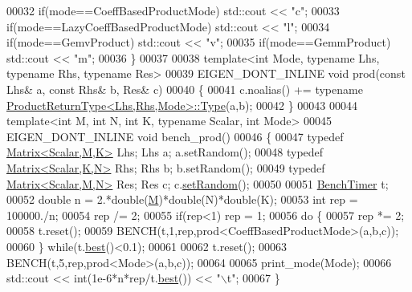 \begin{DoxyCode}
00032   \textcolor{keywordflow}{if}(mode==CoeffBasedProductMode) std::cout << \textcolor{stringliteral}{"c"};
00033   \textcolor{keywordflow}{if}(mode==LazyCoeffBasedProductMode) std::cout << \textcolor{stringliteral}{"l"};
00034   \textcolor{keywordflow}{if}(mode==GemvProduct) std::cout << \textcolor{stringliteral}{"v"};
00035   \textcolor{keywordflow}{if}(mode==GemmProduct) std::cout << \textcolor{stringliteral}{"m"};
00036 \}
00037 
00038 \textcolor{keyword}{template}<\textcolor{keywordtype}{int} Mode, \textcolor{keyword}{typename} Lhs, \textcolor{keyword}{typename} Rhs, \textcolor{keyword}{typename} Res>
00039 EIGEN\_DONT\_INLINE \textcolor{keywordtype}{void} prod(\textcolor{keyword}{const} Lhs& a, \textcolor{keyword}{const} Rhs& b, Res& c)
00040 \{
00041   c.noalias() += \textcolor{keyword}{typename} \hyperlink{struct_eigen_1_1_product_return_type}{ProductReturnType<Lhs,Rhs,Mode>::Type}(a,b);
00042 \}
00043 
00044 \textcolor{keyword}{template}<\textcolor{keywordtype}{int} M, \textcolor{keywordtype}{int} N, \textcolor{keywordtype}{int} K, \textcolor{keyword}{typename} Scalar, \textcolor{keywordtype}{int} Mode>
00045 EIGEN\_DONT\_INLINE \textcolor{keywordtype}{void} bench\_prod()
00046 \{
00047   \textcolor{keyword}{typedef} \hyperlink{group___core___module_class_eigen_1_1_matrix}{Matrix<Scalar,M,K>} Lhs; Lhs a; a.setRandom();
00048   \textcolor{keyword}{typedef} \hyperlink{group___core___module_class_eigen_1_1_matrix}{Matrix<Scalar,K,N>} Rhs; Rhs b; b.setRandom();
00049   \textcolor{keyword}{typedef} \hyperlink{group___core___module_class_eigen_1_1_matrix}{Matrix<Scalar,M,N>} Res; Res c; c.\hyperlink{class_eigen_1_1_plain_object_base_af0e576a0e1aefc9ee346de44cc352ba3}{setRandom}();
00050 
00051   \hyperlink{class_eigen_1_1_bench_timer}{BenchTimer} t;
00052   \textcolor{keywordtype}{double} n = 2.*double(\hyperlink{group___core___module_class_eigen_1_1_matrix}{M})*double(N)*double(K);
00053   \textcolor{keywordtype}{int} rep = 100000./n;
00054   rep /= 2;
00055   \textcolor{keywordflow}{if}(rep<1) rep = 1;
00056   \textcolor{keywordflow}{do} \{
00057     rep *= 2;
00058     t.reset();
00059     BENCH(t,1,rep,prod<CoeffBasedProductMode>(a,b,c));
00060   \} \textcolor{keywordflow}{while}(t.\hyperlink{class_eigen_1_1_bench_timer_ae8b673b0fa356d3432c7a65c79e8af0e}{best}()<0.1);
00061   
00062   t.reset();
00063   BENCH(t,5,rep,prod<Mode>(a,b,c));
00064 
00065   print\_mode(Mode);
00066   std::cout << int(1e-6*n*rep/t.\hyperlink{class_eigen_1_1_bench_timer_ae8b673b0fa356d3432c7a65c79e8af0e}{best}()) << \textcolor{stringliteral}{"\(\backslash\)t"};
00067 \}

\end{DoxyCode}
